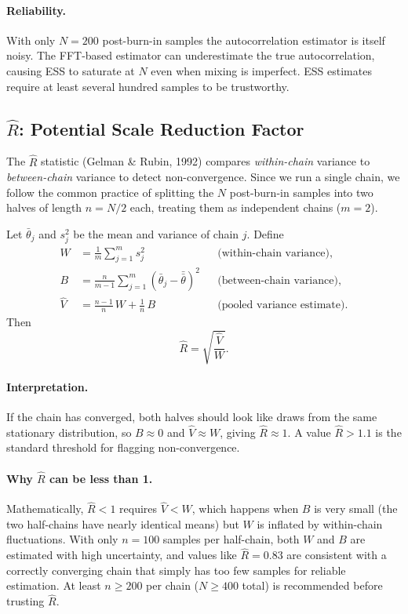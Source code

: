 \documentclass{article}
\begin{document}
\paragraph{Reliability.}
With only $N = 200$ post-burn-in samples the autocorrelation estimator is itself noisy.  The
FFT-based estimator can underestimate the true autocorrelation, causing ESS to saturate at $N$
even when mixing is imperfect.  ESS estimates require at least several hundred samples to be
trustworthy.

\subsection{$\hat{R}$: Potential Scale Reduction Factor}

The $\hat{R}$ statistic (Gelman \& Rubin, 1992) compares \emph{within-chain} variance to
\emph{between-chain} variance to detect non-convergence.  Since we run a single chain, we follow
the common practice of splitting the $N$ post-burn-in samples into two halves of length
$n = N/2$ each, treating them as independent chains ($m = 2$).

Let $\bar\theta_j$ and $s_j^2$ be the mean and variance of chain $j$.  Define
\begin{align}
  W &= \frac{1}{m}\sum_{j=1}^{m} s_j^2
  && \text{(within-chain variance)}, \\[4pt]
  B &= \frac{n}{m-1}\sum_{j=1}^{m}(\bar\theta_j - \bar{\bar\theta})^2
  && \text{(between-chain variance)}, \\[4pt]
  \hat{V} &= \frac{n-1}{n}\,W + \frac{1}{n}\,B
  && \text{(pooled variance estimate)}.
\end{align}
Then
\begin{equation}
  \hat{R} = \sqrt{\frac{\hat{V}}{W}}.
\end{equation}

\paragraph{Interpretation.}
If the chain has converged, both halves should look like draws from the same stationary
distribution, so $B \approx 0$ and $\hat{V} \approx W$, giving $\hat{R} \approx 1$.
A value $\hat{R} > 1.1$ is the standard threshold for flagging non-convergence.

\paragraph{Why $\hat{R}$ can be less than 1.}
Mathematically, $\hat{R} < 1$ requires $\hat{V} < W$, which happens when $B$ is very small
(the two half-chains have nearly identical means) but $W$ is inflated by within-chain
fluctuations.  With only $n = 100$ samples per half-chain, both $W$ and $B$ are estimated
with high uncertainty, and values like $\hat{R} = 0.83$ are consistent with a correctly
converging chain that simply has too few samples for reliable estimation.  At least
$n \geq 200$ per chain ($N \geq 400$ total) is recommended before trusting $\hat{R}$.





\end{document}
